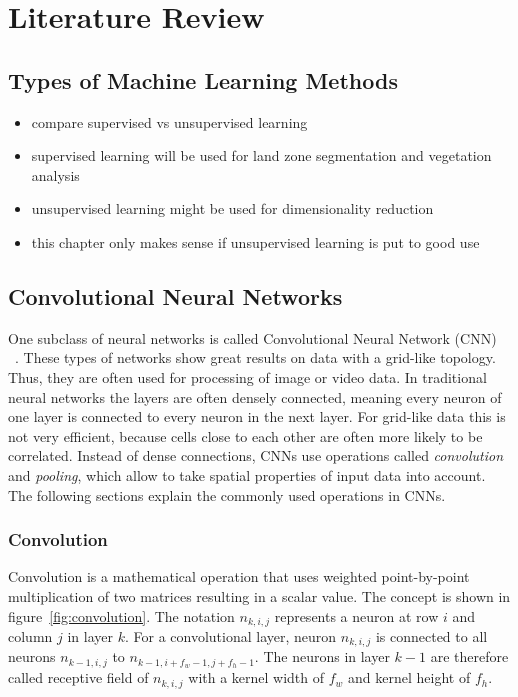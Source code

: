 \section{Literature Review}

\subsection{Types of Machine Learning Methods}
\begin{itemize}
    \item compare supervised vs unsupervised learning
    \item supervised learning will be used for land zone segmentation and vegetation analysis
    \item unsupervised learning might be used for dimensionality reduction
    \item this chapter only makes sense if unsupervised learning is put to good use
\end{itemize}

\subsection{Convolutional Neural Networks}
One subclass of neural networks is called Convolutional Neural Network (CNN) ~\cite[p.~359]{praxiseinstieg_ml17}. These types of networks show great results on data with a grid-like topology. Thus, they are often used for processing of image or video data. In traditional neural networks the layers are often densely connected, meaning every neuron of one layer is connected to every neuron in the next layer. For grid-like data this is not very efficient, because cells close to each other are often more likely to be correlated. Instead of dense connections, CNNs use operations called \emph{convolution} and \emph{pooling}, which allow to take spatial properties of input data into account. The following sections explain the commonly used operations in CNNs.

\subsubsection{Convolution}
Convolution is a mathematical operation that uses weighted point-by-point multiplication of two matrices resulting in a scalar value. The concept is shown in figure~\ref{fig:convolution}. The notation $n_{k, i, j}$ represents a neuron at row $i$ and column $j$ in layer $k$. For a convolutional layer, neuron $n_{k, i, j}$ is connected to all neurons $n_{k-1, i, j}$ to $n_{k-1, i + f_w -1, j + f_h -1}$. The neurons in layer $k-1$ are therefore called receptive field of $n_{k, i, j}$ with a kernel width of $f_w$ and kernel height of $f_h$.~\cite[p.~361f]{praxiseinstieg_ml17}

